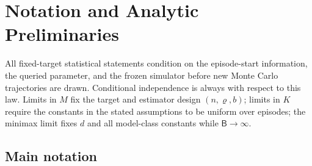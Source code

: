 \section{Notation and Analytic Preliminaries}\label{app:notation}

All fixed-target statistical statements condition on the episode-start information, the queried parameter, and the frozen simulator before new Monte Carlo trajectories are drawn.  Conditional independence is always with respect to this law.  Limits in $M$ fix the target and estimator design $(n,\varrho,b)$; limits in $K$ require the constants in the stated assumptions to be uniform over episodes; the minimax limit fixes $d$ and all model-class constants while $\mathsf B\to\infty$.

\subsection{Main notation}

